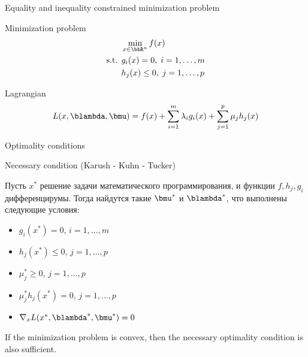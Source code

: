 \documentclass[12pt]{beamer}
\begin{document}
\begin{frame}{{\small Equality and inequality constrained minimization problem}}

\begin{block}{Minimization problem}
\vspace{-5mm}
\begin{equation*}
\begin{split}
& \min\limits_{x \in \bbR^n} f(x)\\
\text{s.t. } & g_i(x) = 0, \; i = 1,\ldots,m\\
& h_j(x) \leq 0, \; j = 1,\ldots, p
\end{split}
\end{equation*}
\end{block}

\begin{block}{Lagrangian}
\begin{equation*}
L(x, \blambda, \bmu) = f(x) + \sum\limits_{i=1}^m\lambda_i g_i(x) + \sum\limits_{j=1}^p \mu_j h_j(x)
\end{equation*}
\end{block}
\end{frame}

\begin{frame}{Optimality conditions}
\begin{block}{Necessary condition (Karush - Kuhn - Tucker)}

Пусть $x^*$ решение задачи математического программирования, и функции $f, h_j, g_i$ дифференцирумы. 
Тогда найдутся такие $\bmu^*$ и $\blambda^*$, что выполнены следующие условия:
\begin{itemize}
\item $g_i(x^*) = 0$, $i = 1,\ldots,m$
\item $h_j(x^*) \leq 0$, $j = 1,\ldots,p$
\item $ \mu^*_j \geq 0$, $j = 1,\ldots,p$
\item $\mu^*_jh_j(x^*) = 0$, $j = 1,\ldots,p$
\item $\nabla_x L(x^*, \blambda^*, \bmu^*) = 0$
\end{itemize}
\end{block}
If the minimization problem is convex, then the necessary optimality condition is also sufficient.
\end{frame}
\end{document}
